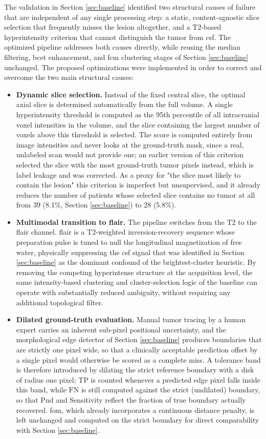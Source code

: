 The validation in Section \ref{sec:baseline} identified two structural causes of failure that are independent of any single processing step: a static, content-agnostic slice selection that frequently misses the lesion altogether, and a T2-based hyperintensity criterion that cannot distinguish the tumor from \gls{csf}. The optimized pipeline addresses both causes directly, while reusing the median filtering, \gls{bcet} enhancement, and \gls{fcm} clustering stages of Section \ref{sec:baseline} unchanged.
The proposed optimizations were implemented in order to correct and overcome the two main structural causes:
\begin{itemize}
    \item \textbf{Dynamic slice selection.} Instead of the fixed central slice, the optimal axial slice is determined automatically from the full volume. A single hyperintensity threshold is computed as the 95th percentile of all intracranial voxel intensities in the volume, and the slice containing the largest number of voxels above this threshold is selected. The score is computed entirely from image intensities and never looks at the ground-truth mask, since a real, unlabeled scan would not provide one; an earlier version of this criterion selected the slice with the most ground-truth tumor pixels instead, which is label leakage and was corrected. As a proxy for "the slice most likely to contain the lesion" this criterion is imperfect but unsupervised, and it already reduces the number of patients whose selected slice contains no tumor at all from 39 (8.1\%, Section \ref{sec:baseline}) to 28 (5.8\%).
    \item \textbf{Multimodal transition to \gls{flair}.} The pipeline switches from the T2 to the \gls{flair} channel. \gls{flair} is a T2-weighted inversion-recovery sequence \cite{hajnal1992flair} whose preparation pulse is tuned to null the longitudinal magnetization of free water, physically suppressing the \gls{csf} signal that was identified in Section \ref{sec:baseline} as the dominant confound of the brightest-cluster heuristic. By removing the competing hyperintense structure at the acquisition level, the same intensity-based clustering and cluster-selection logic of the baseline can operate with substantially reduced ambiguity, without requiring any additional topological filter.
    \item \textbf{Dilated ground-truth evaluation.} Manual tumor tracing by a human expert carries an inherent sub-pixel positional uncertainty, and the morphological edge detector of Section \ref{sec:baseline} produces boundaries that are strictly one pixel wide, so that a clinically acceptable prediction offset by a single pixel would otherwise be scored as a complete miss. A tolerance band is therefore introduced by dilating the strict reference boundary with a disk of radius one pixel; $\mathrm{TP}$ is counted whenever a predicted edge pixel falls inside this band, while $\mathrm{FN}$ is still computed against the strict (undilated) boundary, so that $\mathrm{Pnd}$ and Sensitivity reflect the fraction of true boundary actually recovered. \gls{fom}, which already incorporates a continuous distance penalty, is left unchanged and computed on the strict boundary for direct comparability with Section \ref{sec:baseline}.

\end{itemize}
